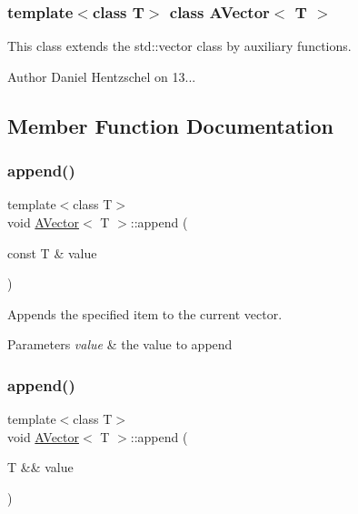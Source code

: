 \subsubsection*{template$<$class T$>$\newline
class A\+Vector$<$ T $>$}

This class extends the std\+::vector class by auxiliary functions. 

\begin{DoxyAuthor}{Author}
Daniel Hentzschel on 13... 
\end{DoxyAuthor}


\subsection{Member Function Documentation}
\mbox{\label{class_a_vector_ab998b222eb341c26f4eafd8da65f2274}} 
\subsubsection{\texorpdfstring{append()}{append()}\hspace{0.1cm}{\footnotesize\ttfamily [1/2]}}
{\footnotesize\ttfamily template$<$class T$>$ \\
void \mbox{\hyperlink{class_a_vector}{A\+Vector}}$<$ T $>$\+::append (\begin{DoxyParamCaption}\item[{const T \&}]{value }\end{DoxyParamCaption})}



Appends the specified item to the current vector. 


\begin{DoxyParams}{Parameters}
{\em value} & the value to append \\
\hline
\end{DoxyParams}
\mbox{\label{class_a_vector_aae594c91729d29605c2fe4a71cbf6f0c}} 
\subsubsection{\texorpdfstring{append()}{append()}\hspace{0.1cm}{\footnotesize\ttfamily [2/2]}}
{\footnotesize\ttfamily template$<$class T$>$ \\
void \mbox{\hyperlink{class_a_vector}{A\+Vector}}$<$ T $>$\+::append (\begin{DoxyParamCaption}\item[{T \&\&}]{value }\end{DoxyParamCaption})}



